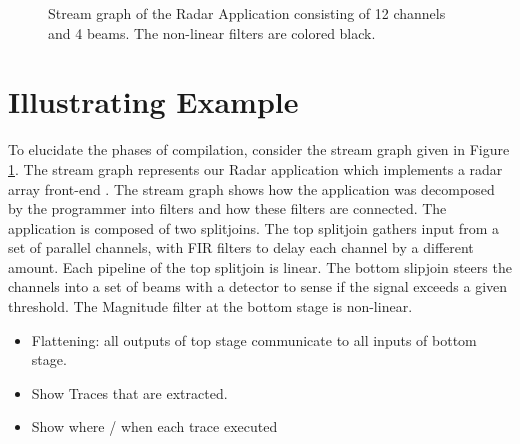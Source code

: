 \begin{figure}
\centering
{}
\caption{Stream graph of the Radar Application consisting of 12
channels and 4 beams. The non-linear filters are colored black. 
\label{fig:beam-graph}}
\end{figure}

\section{Illustrating Example}
\label{sec:example}

To elucidate the phases of compilation, consider the stream graph
given in Figure \ref{fig:beam-graph}.  The stream graph represents our
Radar application which implements a radar array front-end \cite{pca}.
The stream graph shows how the application was decomposed by the
programmer into filters and how these filters are connected.  The
application is composed of two splitjoins.  The top splitjoin gathers
input from a set of parallel channels, with FIR filters to delay each
channel by a different amount.  Each pipeline of the top splitjoin is
linear.  The bottom slipjoin steers the channels into a set of beams
with a detector to sense if the signal exceeds a given threshold.  
The Magnitude filter at the bottom stage is non-linear.  

\begin{itemize}
\item Flattening: all outputs of top stage communicate to all inputs
of bottom stage.
\item Show Traces that are extracted.
\item Show where / when each trace executed
\end{itemize}
